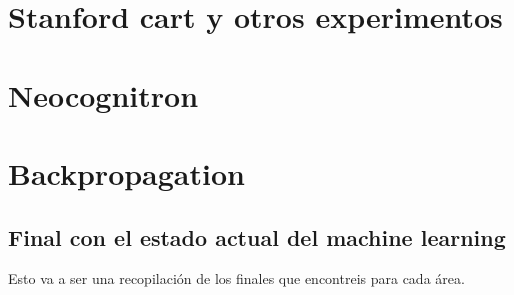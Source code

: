 \documentclass[a4paper, 11pt]{article} %
\begin{document}
\section{Stanford cart y otros experimentos}
\section{Neocognitron}
\section{Backpropagation}

\subsection{Final con el estado actual del machine learning}
Esto va a ser una recopilación de los finales que encontreis para cada área.
\end{document}

